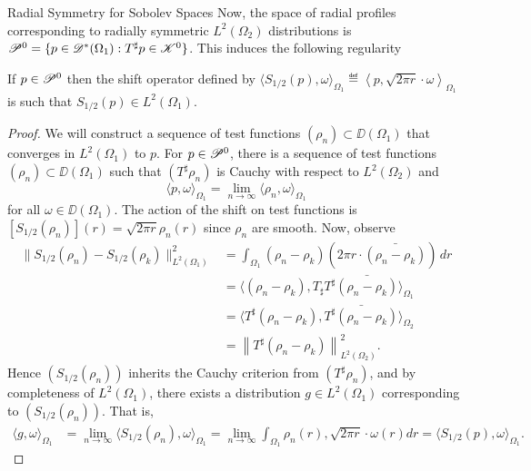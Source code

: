 \begin{chapter}{Radial Symmetry for Sobolev Spaces}
Now, the space of radial profiles corresponding to radially symmetric $L^2(\Omega_2)$ distributions is $\mathscr P^0 = \{p \in \mathscr D^*(\Omega_1): T^\sharp p \in \mathscr K^0\}$.
This induces the following regularity 
\begin{prop} \label{prop:radialL2}
  If $p \in \mathscr P^0$ then the shift operator defined by $\langle S_{1/2}(p),\omega\rangle_{\Omega_1} \eqdef \left\langle p, \sqrt{2\pi r}\cdot \omega\right\rangle_{\Omega_1}$ is such that $S_{1/2}(p) \in L^2(\Omega_1)$.
\end{prop}
\begin{proof}
  We will construct a sequence of test functions $(\rho_n) \subset \DD(\Omega_1)$ that converges in $L^2(\Omega_1)$ to $p$.
For $p\in \mathscr P^0$, there is a sequence of test functions $(\rho_n)\subset \DD(\Omega_1)$ such that $(T^\sharp \rho_n)$ is Cauchy with respect to $L^2(\Omega_2)$ and
\begin{equation}
  \langle p,\omega\rangle_{\Omega_1} = \lim_{n\to\infty}\langle \rho_n, \omega\rangle_{\Omega_1}
\end{equation}
for all $\omega\in \DD(\Omega_1)$.
The action of the shift on test functions is $[S_{1/2}(\rho_n)](r) = \sqrt{2\pi r}\rho_n(r)$ since $\rho_n$ are smooth.
Now, observe
\begin{align}
  \|S_{1/2}(\rho_n) - S_{1/2}(\rho_k)\|_{L^2(\Omega_1)}^2 
  &= \int_{\Omega_1} (\rho_n - \rho_k)\left(2\pi r\cdot \bar{(\rho_n - \rho_k)}\right) \,dr \nonumber\\
  &= \Big\langle (\rho_n - \rho_k),T_\sharp T^\sharp\bar{(\rho_n - \rho_k)} \Big\rangle_{\Omega_1} \nonumber\\
  &= \Big\langle T^\sharp (\rho_n - \rho_k),\bar{T^\sharp(\rho_n - \rho_k)} \Big\rangle_{\Omega_2} \nonumber\\
  &= \left\| T^\sharp (\rho_n - \rho_k)\right\|_{L^2(\Omega_2)}^2. \label{eq:isometry}
\end{align}
Hence $\left(S_{1/2}(\rho_n)\right)$ inherits the Cauchy criterion from $(T^\sharp\rho_n)$, and by completeness of $L^2(\Omega_1)$, there exists a distribution $g \in L^2(\Omega_1)$ corresponding to $\left(S_{1/2}(\rho_n)\right)$. 
That is,
\begin{align}
  \Big\langle g,\omega\Big\rangle_{\Omega_1} 
    &= \lim_{n\to \infty} \Big\langle S_{1/2}(\rho_n),\omega\Big\rangle_{\Omega_1} = \lim_{n\to \infty} \int_{\Omega_1} \rho_n(r),\sqrt{2\pi r}\cdot \omega(r)dr = \Big\langle S_{1/2}(p),\omega\Big\rangle_{\Omega_1}.
\end{align}
\end{proof}

\end{chapter}
